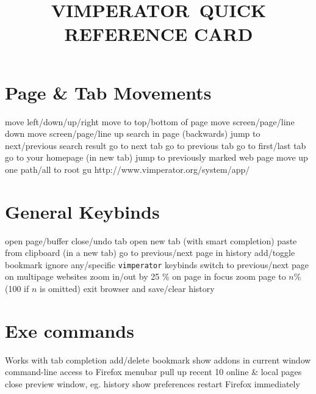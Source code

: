 
\def\content{VIMPERATOR}
\def\versionnumber{1.0}  %


\def\version{v\versionnumber\ \month\ \year}




\title{\uppercase{\content\ quick reference card}}

\shortintro

\vskip 0.5cm

\section{Page \& Tab Movements}{}
	{move left/down/up/right}
	{move to top/bottom of page}
	{move screen/page/line down}
	{move screen/page/line up}
	{search in page (backwards)}
	{jump to next/previous search result}
	{go to next tab}
	{go to previous tab}
	{go to first/last tab}
	{go to your homepage (in new tab)}
	{jump to previously marked web page}
	{move up one path/all to root}
	{gu http://www.vimperator.org/system/app/}

\section{General Keybinds}{}
	{open page/buffer}
	{close/undo tab}
	{open new tab (with smart completion)}
	{paste from clipboard (in a new tab)}
	{go to previous/next page in history}
	{add/toggle bookmark}
	{ignore any/specific {\tt vimperator} keybinds}
\cmdS{\lbracket\lbracket~\rbracket\rbracket}	{switch to previous/next page on multipage websites}
\cmdS{+~-}	{zoom in/out by 25 \% on page in focus}
	{zoom page to $n$\% (100 if $n$ is omitted)}
	{exit browser and save/clear history}
%
\\
%
\section{Exe commands}{Works with tab completion}
	{add/delete bookmark}
	{show addons in current window}
	{command-line access to Firefox menubar}
	{pull up recent 10 online \& local pages}
	{close preview window, eg. history}
	{show preferences}
	{restart Firefox immediately}

